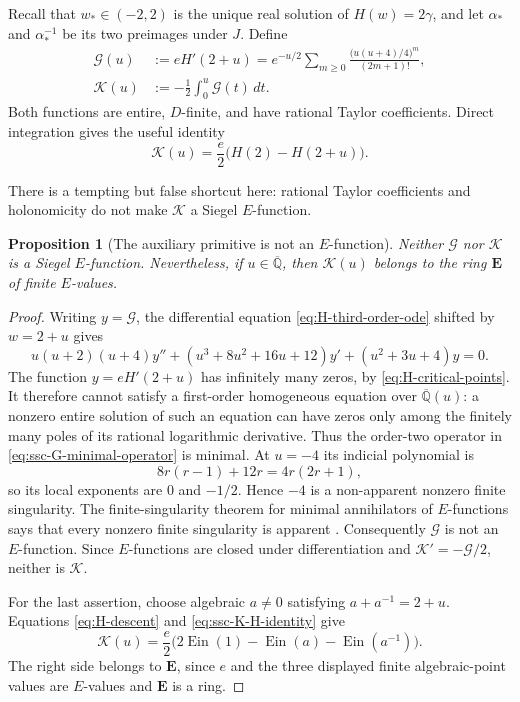 \documentclass[11pt]{article}
\newtheorem{proposition}[theorem]{Proposition}
\theoremstyle{definition}
\theoremstyle{remark}
\newcommand{\Qbar}{\overline{\mathbb Q}}
\newcommand{\Ein}{\operatorname{Ein}}
\begin{document}
Recall that \(w_*\in(-2,2)\) is the unique real solution of
\(H(w)=2\gamma\), and let \(\alpha_*\) and \(\alpha_*^{-1}\) be its two
preimages under \(J\).  Define
\begin{align}
 \mathcal G(u)
 &:=eH'(2+u)
   =e^{-u/2}\sum_{m\geq0}
     \frac{\bigl(u(u+4)/4\bigr)^m}{(2m+1)!},
     \label{eq:ssc-G-definition}\\
 \mathcal K(u)
 &:=-\frac12\int_0^u\mathcal G(t)\,dt.
     \label{eq:ssc-K-definition}
\end{align}
Both functions are entire, $D$-finite, and have rational Taylor
coefficients.  Direct integration gives the useful identity
\begin{equation}\label{eq:ssc-K-H-identity}
 \mathcal K(u)=\frac e2\bigl(H(2)-H(2+u)\bigr).
\end{equation}

There is a tempting but false shortcut here: rational Taylor coefficients
and holonomicity do not make \(\mathcal K\) a Siegel \(E\)-function.

\begin{proposition}[The auxiliary primitive is not an \(E\)-function]
\label{prop:ssc-K-not-E}
Neither \(\mathcal G\) nor \(\mathcal K\) is a Siegel \(E\)-function.
Nevertheless, if \(u\in\Qbar\), then \(\mathcal K(u)\) belongs to the ring
\(\mathbf E\) of finite \(E\)-values.
\end{proposition}

\begin{proof}
Writing \(y=\mathcal G\), the differential equation
\eqref{eq:H-third-order-ode} shifted by \(w=2+u\) gives
\begin{equation}\label{eq:ssc-G-minimal-operator}
 u(u+2)(u+4)y''
 +(u^3+8u^2+16u+12)y'
 +(u^2+3u+4)y=0.
\end{equation}
The function \(y=eH'(2+u)\) has infinitely many zeros, by
\eqref{eq:H-critical-points}.  It therefore cannot satisfy a first-order
homogeneous equation over \(\Qbar(u)\): a nonzero entire solution of such an
equation can have zeros only among the finitely many poles of its rational
logarithmic derivative.  Thus the order-two operator in
\eqref{eq:ssc-G-minimal-operator} is minimal.  At \(u=-4\) its indicial
polynomial is
\[
 8r(r-1)+12r=4r(2r+1),
\]
so its local exponents are \(0\) and \(-1/2\).  Hence \(-4\) is a
non-apparent nonzero finite singularity.  The finite-singularity theorem for
minimal annihilators of \(E\)-functions says that every nonzero finite
singularity is apparent \cite{Andre2000}.  Consequently
\(\mathcal G\) is not an \(E\)-function.  Since \(E\)-functions are closed
under differentiation and \(\mathcal K'=-\mathcal G/2\), neither is
\(\mathcal K\).

For the last assertion, choose algebraic \(a\ne0\) satisfying
\(a+a^{-1}=2+u\).  Equations \eqref{eq:H-descent} and
\eqref{eq:ssc-K-H-identity} give
\begin{equation}\label{eq:ssc-K-finite-E-values}
 \mathcal K(u)=\frac e2
 \bigl(2\Ein(1)-\Ein(a)-\Ein(a^{-1})\bigr).
\end{equation}
The right side belongs to \(\mathbf E\), since \(e\) and the three displayed
finite algebraic-point values are \(E\)-values and \(\mathbf E\) is a ring.
\end{proof}
\end{document}
